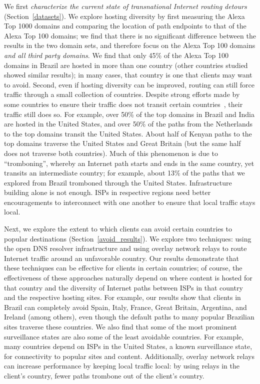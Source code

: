 We first {\em characterize the current state of transnational Internet
routing detours} (Section~\ref{datasets}).  We explore hosting diversity 
by first measuring the Alexa Top 1000 domains and comparing the location of 
path endpoints to that of the Alexa Top 100 domains; we find that there is no 
significant difference between the results in the two domain sets, and therefore 
focus on the Alexa Top 100 domains {\it and all third party domains}.  We find 
that only 45\% of the Alexa Top 100 domains in Brazil are hosted 
in more than one country (other countries studied showed similar results); in many cases,
that country is one that clients may want to avoid. Second, even if
hosting diversity can be improved, routing can still force traffic
through a small collection of countries. Despite strong efforts made by some countries to ensure their
traffic does not transit certain countries~\cite{brazil_history,
  brazil_break_from_US, brazil_conference, brazil_conference2,
  brazil_human_rights}, their traffic still does so.  For example, over 50\% of the
top domains in Brazil and India are hosted in the United States, and
over 50\% of the paths from the Netherlands to the top domains transit
the United States.  About half of Kenyan paths to the top domains
traverse the United States and Great Britain (but the same half does not
traverse both countries).  Much of this phenomenon is due to
``tromboning'', whereby an Internet path starts and ends in the same country,
yet transits an intermediate country; for example, about 13\% of the
paths that we explored from Brazil tromboned through the United States.
Infrastructure building alone is not enough. ISPs in respective regions
need better encouragements to interconnect with one another to ensure
that local traffic stays local.

Next, we {explore the extent to which
clients can avoid certain countries to popular destinations}
(Section~\ref{avoid_results}).  We explore two techniques: using the
open DNS resolver infrastructure and using overlay network relays to route 
Internet traffic around an unfavorable country.  Our results demonstrate that these techniques can
be effective for clients in certain countries; of course, the effectiveness of
these approaches naturally depend on where content is hosted for that country
and the diversity of Internet paths between ISPs in that country and the
respective hosting sites. For example, our results show that clients in Brazil
can completely avoid Spain, Italy, France, Great Britain, Argentina, and
Ireland (among others), even though the default paths to many popular
Brazilian sites traverse these countries. We also find that some of the most
prominent surveillance states are also some of the least avoidable countries.
For example, many countries depend on ISPs in the United States, a known
surveillance state, for connectivity to popular sites and content.
Additionally, overlay network relays can increase performance by keeping local
traffic local: by using relays in the client's country, fewer paths trombone
out of the client's country.


